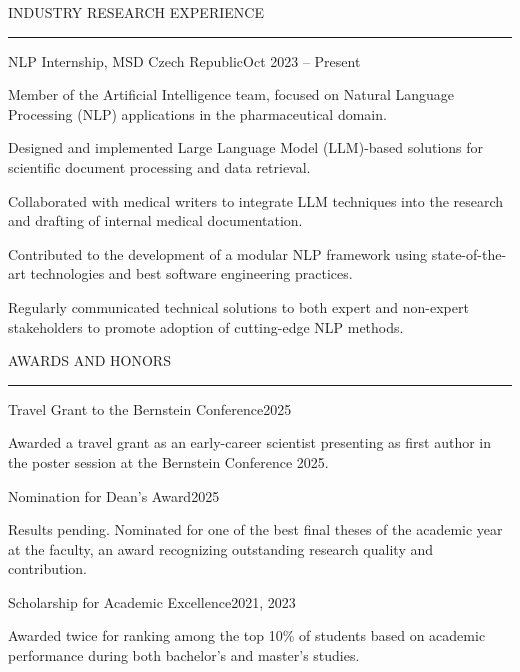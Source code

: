 \documentclass{resume} %
\renewenvironment{rSection}[1]{
\sectionskip
\textcolor{CarnegieMellonRed}{\MakeUppercase{#1}}
\sectionlineskip
\hrule
\begin{list}{}{
\setlength{\leftmargin}{1.5em}
}
\item[]
}{
\end{list}
}
\begin{document}
\begin{rSection}{Industry Research Experience}

\begin{rProject}{\large NLP Internship, MSD Czech Republic}{Oct 2023 -- Present}{}{}
    \item Member of the Artificial Intelligence team, focused on Natural Language Processing (NLP) applications in the pharmaceutical domain.
    \item Designed and implemented Large Language Model (LLM)-based solutions for scientific document processing and data retrieval.
    \item Collaborated with medical writers to integrate LLM techniques into the research and drafting of internal medical documentation.
    \item Contributed to the development of a modular NLP framework using state-of-the-art technologies and best software engineering practices.
    \item Regularly communicated technical solutions to both expert and non-expert stakeholders to promote adoption of cutting-edge NLP methods.
\end{rProject}

\end{rSection}


\begin{rSection}{Awards and Honors} \itemsep -2pt

\begin{rProject}{\large Travel Grant to the Bernstein Conference}{2025}{}{}
    \item Awarded a travel grant as an early-career scientist presenting as first author in the poster session at the Bernstein Conference 2025.
\end{rProject}

\begin{rProject}{\large Nomination for Dean's Award}{2025}{}{}
    \item Results pending. Nominated for one of the best final theses of the academic year at the faculty, an award recognizing outstanding research quality and contribution.
\end{rProject}

\begin{rProject}{Scholarship for Academic Excellence}{2021, 2023}{}{}
    \item Awarded twice for ranking among the top 10\% of students based on academic performance during both bachelor's and master's studies.
\end{rProject}

\end{rSection}
\end{document}
